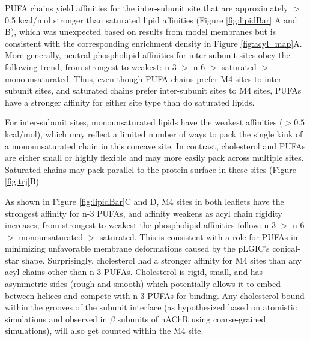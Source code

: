 \documentclass[%
 aip,
 amsmath,amssymb,
 preprint,%
]{revtex4-1}\usepackage{setspace}
\newcommand{\liam}[1]{\textcolor{black}{#1}}
\newcommand{\nachr}{nAChR}
\newcommand{\plgic}{pLGIC}
\begin{document}
PUFA chains yield affinities for the  \liam{inter-subunit} site that are approximately $>$0.5 kcal/mol stronger than saturated lipid affinities (Figure \ref{fig:lipidBar} A and B), which was unexpected based on results from model membranes but is consistent with the corresponding enrichment density in Figure \ref{fig:acyl_map}A. More generally, neutral phospholipid affinities for  \liam{inter-subunit} sites obey the following trend, from strongest to weakest: n-3 $>$ n-6 $>$ saturated $>$ monounsaturated. Thus, even though PUFA chains prefer M4 sites to inter-subunit sites,  and saturated chains prefer inter-subunit sites to M4 sites, PUFAs have a stronger affinity for either site type than do saturated lipids. 
 
For  \liam{inter-subunit} sites, monounsaturated lipids have the weakest affinities ($>0.5$ kcal/mol), which may reflect a limited number of ways to pack the single kink of a monounsaturated chain in this concave site. In contrast, cholesterol and PUFAs are either small or highly flexible and may more easily pack across multiple sites. Saturated chains may pack parallel to the protein surface in these sites (Figure \ref{fig:trj}B) 

As shown in Figure \ref{fig:lipidBar}C and D, M4 sites in both leaflets have the strongest affinity for n-3 PUFAs, and affinity weakens as acyl chain rigidity increases; from strongest to weakest the phospholipid affinities follow: n-3 $>$ n-6 $>$ monounsaturated $>$ saturated.  This is consistent with a role for PUFAs in minimizing unfavorable membrane deformations caused by the \plgic's conical-star shape.\cite{Brannigan2007,Kim1998,Dan1993,Goulian1996,Goulian1993,Fournier2015}  Surprisingly, cholesterol had a stronger affinity for M4 sites than any acyl chains other than n-3 PUFAs. Cholesterol is rigid, small, and has asymmetric sides (rough and smooth) which potentially allows it to embed between \liam{helices} and compete with n-3 PUFAs for binding. Any cholesterol bound within the grooves of the subunit interface (as hypothesized based on atomistic simulations\cite{Brannigan2008} and observed in $\beta$ subunits  of \nachr{} using coarse-grained simulations\cite{Sharp2019}), will also get counted within the M4 site.   %
\end{document}
